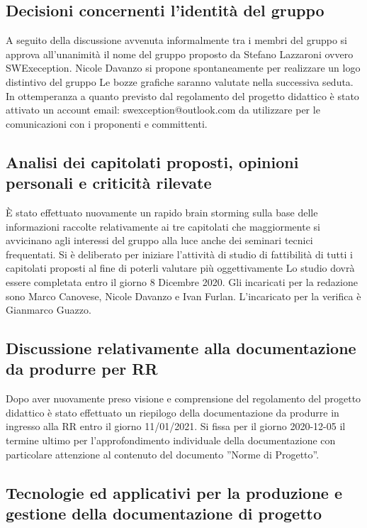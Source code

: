 \subsection{Decisioni concernenti l'identità del gruppo}
A seguito della discussione avvenuta informalmente tra i membri del gruppo si approva all'unanimità il nome del gruppo proposto da Stefano Lazzaroni ovvero SWExeception. Nicole Davanzo si propone spontaneamente per realizzare un logo distintivo del gruppo Le bozze grafiche saranno valutate nella successiva seduta.
In ottemperanza a quanto previsto dal regolamento del progetto didattico è stato attivato un account email: swexception@outlook.com da utilizzare per le comunicazioni con i proponenti e committenti.

\subsection{Analisi dei capitolati proposti, opinioni personali e criticità rilevate}
È stato effettuato nuovamente un rapido brain storming sulla base delle informazioni raccolte relativamente ai tre capitolati che maggiormente si avvicinano agli interessi del gruppo alla luce anche dei seminari tecnici frequentati.
Si è deliberato per iniziare l'attività di studio di fattibilità di tutti i capitolati proposti al fine di poterli valutare più oggettivamente Lo studio dovrà essere completata entro il giorno 8 Dicembre 2020. Gli incaricati per la redazione sono Marco Canovese, Nicole Davanzo e Ivan Furlan. L'incaricato per la verifica è Gianmarco Guazzo.

\subsection{Discussione relativamente alla documentazione da produrre per RR}
Dopo aver nuovamente preso visione e comprensione del regolamento del progetto didattico è stato effettuato un riepilogo della documentazione da produrre in ingresso alla RR entro il giorno 11/01/2021. Si fissa per il giorno 2020-12-05 il termine ultimo per l'approfondimento individuale della documentazione con particolare attenzione al contenuto del documento ”Norme di Progetto”.

\subsection{Tecnologie ed applicativi per la produzione e gestione della documentazione di progetto}


